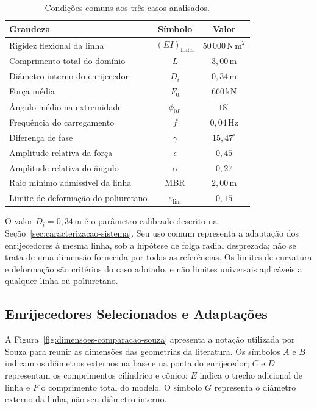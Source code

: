 \documentclass[arial,centeredequations,english,brazilian,oneside,section=TITLE]{ifes8}
\begin{document}
\begin{table}[!htbp]
  \centering
  \caption{Condições comuns aos três casos analisados.}
  \label{tab:condicoes-comuns-estudo}
  \begin{tabular}{l c c}
    \hline
    Grandeza & Símbolo & Valor\\
    \hline
    Rigidez flexional da linha & $(EI)_{\mathrm{linha}}$ & $50\,000\,\mathrm{N\,m^2}$\\
    Comprimento total do domínio & $L$ & $3{,}00\,\mathrm{m}$\\
    Diâmetro interno do enrijecedor & $D_i$ & $0{,}34\,\mathrm{m}$\\
    Força média & $F_0$ & $660\,\mathrm{kN}$\\
    Ângulo médio na extremidade & $\phi_{0L}$ & $18^\circ$\\
    Frequência do carregamento & $f$ & $0{,}04\,\mathrm{Hz}$\\
    Diferença de fase & $\gamma$ & $15{,}47^\circ$\\
    Amplitude relativa da força & $\epsilon$ & $0{,}45$\\
    Amplitude relativa do ângulo & $\alpha$ & $0{,}27$\\
    Raio mínimo admissível da linha & MBR & $2{,}00\,\mathrm{m}$\\
    Limite de deformação do poliuretano & $\varepsilon_{\mathrm{lim}}$ & $0{,}15$\\
    \hline
  \end{tabular}
\end{table}

O valor $D_i=0{,}34\,\mathrm{m}$ é o parâmetro calibrado descrito na
Seção~\ref{sec:caracterizacao-sistema}. Seu uso comum representa a adaptação
dos enrijecedores à mesma linha, sob a hipótese de folga radial desprezada;
não se trata de uma dimensão fornecida por todas as referências. Os limites
de curvatura e deformação são critérios do caso adotado, e não limites
universais aplicáveis a qualquer linha ou poliuretano.

\subsection{Enrijecedores Selecionados e Adaptações}
\label{sec:enrijecedores}

A Figura~\ref{fig:dimensoes-comparacao-souza} apresenta a notação utilizada por
Souza para reunir as dimensões das geometrias da literatura. Os símbolos
$A$ e $B$ indicam os diâmetros externos na base e na ponta do enrijecedor;
$C$ e $D$ representam os comprimentos cilíndrico e cônico; $E$ indica o
trecho adicional de linha e $F$ o comprimento total do modelo. O símbolo
$G$ representa o diâmetro externo da linha, não seu diâmetro interno.
\end{document}
